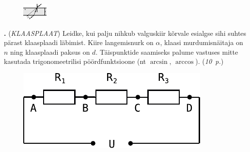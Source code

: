 \documentclass[11pt,a5paper]{article}
\newcommand{\numb}[1]{\vspace{5pt}\textbf{\large #1}}
\newcommand{\nimi}[1]{(\textsl{\small #1})}
\newcommand{\punktid}[1]{(\emph{#1~p.})}
\newcounter{ylesanne}
\newcommand{\yl}[1]{\addtocounter{ylesanne}{1}\numb{\theylesanne.} \nimi{#1} \newblock{}}
\newcommand{\autor}[1]{}%
\begin{document}
\begin{figure}
  \vspace{-2em}
  \begin{center}
    \includegraphics[width=1\linewidth]{klaasplaat_joonis.pdf}
  \end{center}
  \vspace{-2em}
\end{figure}

\yl{KLAASPLAAT}
Leidke, kui palju nihkub valguskiir kõrvale esialgse sihi suhtes pärast klaasplaadi läbimist. Kiire langemisnurk on $\alpha$, klaasi murdumisnäitaja on $n$ ning klaasplaadi paksus on $d$. Täispunktide saamiseks palume vastuses mitte kasutada trigonomeetrilisi pöördfunktsioone (nt $\arcsin$, $\arccos$).
\punktid{10} \autor{Erkki Tempel}

\begin{figure}
  \begin{center}
    \includegraphics[width=1\linewidth]{ahelad_efo.pdf}
  \end{center}
  \vspace{-2em}
\end{figure}
\end{document}
